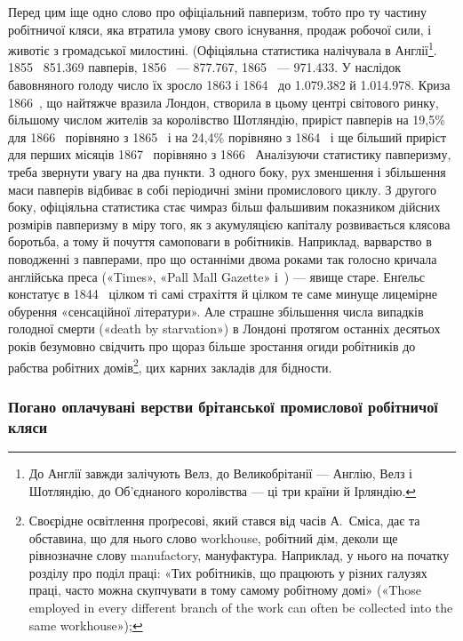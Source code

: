 
Перед цим іще одно слово про офіціальний павперизм, тобто
про ту частину робітничої кляси, яка втратила умову свого існування,
продаж робочої сили, і животіє з громадської милостині.
(Офіціяльна статистика налічувала в Англії\footnote{
До Англії завжди залічують Велз, до Великобрітанії — Англію,
Велз і Шотляндію, до Об’єднаного королівства — ці три країни й Ірляндію.
}. 1855~ \num{851.369} павперів,
1856~ — \num{877.767}, 1865~ — \num{971.433}. У наслідок бавовняного
голоду число їх зросло 1863 і 1864~ до \num{1.079.382}
й \num{1.014.978}. Криза 1866~, що найтяжче вразила Лондон, створила
в цьому центрі світового ринку, більшому числом жителів
за королівство Шотляндію, приріст павперів на 19,5\% для
1866~ порівняно з 1865~ і на 24,4\% порівняно з 1864~ і ще
більший приріст для перших місяців 1867~ порівняно з
1866~ Аналізуючи статистику павперизму, треба звернути увагу
на два пункти. З одного боку, рух зменшення і збільшення маси
павперів відбиває в собі періодичні зміни промислового циклу.
З другого боку, офіціяльна статистика стає чимраз більш фальшивим
показником дійсних розмірів павперизму в міру того,
як з акумуляцією капіталу розвивається клясова боротьба, а
тому й почуття самоповаги в робітників. Наприклад, варварство
в поводженні з павперами, про що останніми двома роками так
голосно кричала англійська преса («Times», «Pall Mall Gazette»
і~) — явище старе. Енґельс констатує в 1844~ цілком
ті самі страхіття й цілком те саме минуще лицемірне обурення
«сенсаційної літератури». Але страшне збільшення числа випадків
голодної смерти («death by starvation») в Лондоні протягом
останніх десятьох років безумовно свідчить про щораз більше зростання
огиди робітників до рабства робітних домів\footnote{
Своєрідне освітлення проґресові, який стався від часів А.~Сміса,
дає та обставина, що для нього слово workhouse, робітний дім, деколи ще
рівнозначне слову manufactory, мануфактура. Наприклад, у нього на
початку розділу про поділ праці: «Тих робітників, що працюють у різних
галузях праці, часто можна скупчувати в тому самому робітному домі»
(«Those employed in every different branch of the work can often be collected
into the same workhouse»);
}, цих карних
закладів для бідности.

\subsubsection{Погано оплачувані верстви брітанської промислової робітничої
кляси}

